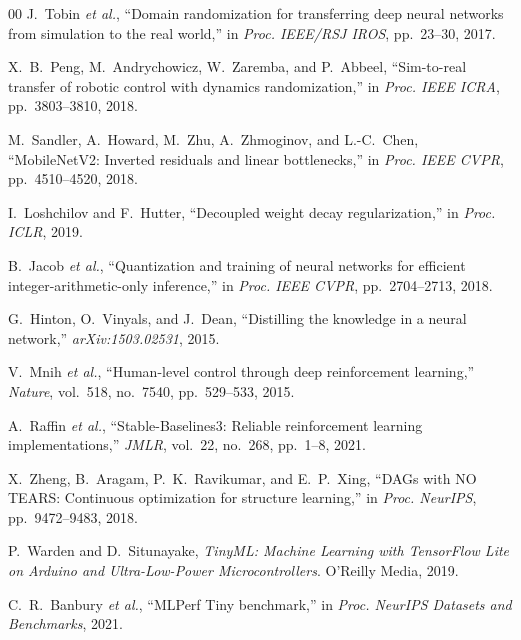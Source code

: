 \documentclass[conference]{IEEEtran}
\begin{document}
\begin{thebibliography}{00}
    J.~Tobin \textit{et al.}, ``Domain randomization for transferring deep neural networks from simulation to the real world,'' in \textit{Proc. IEEE/RSJ IROS}, pp.~23--30, 2017.

    X.~B.~Peng, M.~Andrychowicz, W.~Zaremba, and P.~Abbeel, ``Sim-to-real transfer of robotic control with dynamics randomization,'' in \textit{Proc. IEEE ICRA}, pp.~3803--3810, 2018.

    M.~Sandler, A.~Howard, M.~Zhu, A.~Zhmoginov, and L.-C.~Chen, ``MobileNetV2: Inverted residuals and linear bottlenecks,'' in \textit{Proc. IEEE CVPR}, pp.~4510--4520, 2018.

    I.~Loshchilov and F.~Hutter, ``Decoupled weight decay regularization,'' in \textit{Proc. ICLR}, 2019.

    B.~Jacob \textit{et al.}, ``Quantization and training of neural networks for efficient integer-arithmetic-only inference,'' in \textit{Proc. IEEE CVPR}, pp.~2704--2713, 2018.

    G.~Hinton, O.~Vinyals, and J.~Dean, ``Distilling the knowledge in a neural network,'' \textit{arXiv:1503.02531}, 2015.

    V.~Mnih \textit{et al.}, ``Human-level control through deep reinforcement learning,'' \textit{Nature}, vol.~518, no.~7540, pp.~529--533, 2015.

    A.~Raffin \textit{et al.}, ``Stable-Baselines3: Reliable reinforcement learning implementations,'' \textit{JMLR}, vol.~22, no.~268, pp.~1--8, 2021.

    X.~Zheng, B.~Aragam, P.~K.~Ravikumar, and E.~P.~Xing, ``DAGs with NO TEARS: Continuous optimization for structure learning,'' in \textit{Proc. NeurIPS}, pp.~9472--9483, 2018.


    P.~Warden and D.~Situnayake, \textit{TinyML: Machine Learning with TensorFlow Lite on Arduino and Ultra-Low-Power Microcontrollers}.\hspace{0.2em} O'Reilly Media, 2019.

    C.~R.~Banbury \textit{et al.}, ``MLPerf Tiny benchmark,'' in \textit{Proc. NeurIPS Datasets and Benchmarks}, 2021.


\end{thebibliography}
\end{document}
